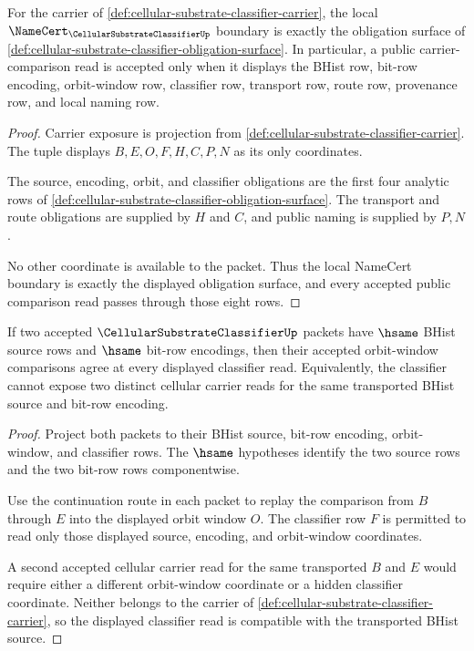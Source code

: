 \begin{theorem}
\label{thm:cellular-substrate-classifier-namecert-boundary}
For the carrier of \autoref{def:cellular-substrate-classifier-carrier}, the local $\NameCert_{\CellularSubstrateClassifierUp}$ boundary is exactly the obligation surface of \autoref{def:cellular-substrate-classifier-obligation-surface}. In particular, a public carrier-comparison read is accepted only when it displays the BHist row, bit-row encoding, orbit-window row, classifier row, transport row, route row, provenance row, and local naming row.
\end{theorem}
\begin{proof}
Carrier exposure is projection from \autoref{def:cellular-substrate-classifier-carrier}. The tuple displays $B,E,O,F,H,C,P,N$ as its only coordinates.

The source, encoding, orbit, and classifier obligations are the first four analytic rows of \autoref{def:cellular-substrate-classifier-obligation-surface}. The transport and route obligations are supplied by $H$ and $C$, and public naming is supplied by $P,N$.

No other coordinate is available to the packet. Thus the local NameCert boundary is exactly the displayed obligation surface, and every accepted public comparison read passes through those eight rows.
\end{proof}

\begin{theorem}
\label{thm:cellular-substrate-classifier-bhist-orbit-compatibility}
If two accepted $\CellularSubstrateClassifierUp$ packets have $\hsame$ BHist source rows and $\hsame$ bit-row encodings, then their accepted orbit-window comparisons agree at every displayed classifier read. Equivalently, the classifier cannot expose two distinct cellular carrier reads for the same transported BHist source and bit-row encoding.
\end{theorem}
\begin{proof}
Project both packets to their BHist source, bit-row encoding, orbit-window, and classifier rows. The $\hsame$ hypotheses identify the two source rows and the two bit-row rows componentwise.

Use the continuation route in each packet to replay the comparison from $B$ through $E$ into the displayed orbit window $O$. The classifier row $F$ is permitted to read only those displayed source, encoding, and orbit-window coordinates.

A second accepted cellular carrier read for the same transported $B$ and $E$ would require either a different orbit-window coordinate or a hidden classifier coordinate. Neither belongs to the carrier of \autoref{def:cellular-substrate-classifier-carrier}, so the displayed classifier read is compatible with the transported BHist source.
\end{proof}

